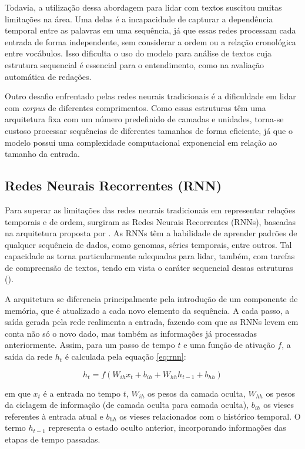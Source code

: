 Todavia, a utilização dessa abordagem para lidar com textos suscitou muitas limitações na área. Uma delas é a incapacidade de capturar a dependência temporal entre as palavras em uma sequência, já que essas redes processam cada entrada de forma independente, sem considerar a ordem ou a relação cronológica entre vocábulos. Isso dificulta o uso do modelo para análise de textos cuja estrutura sequencial é essencial para o entendimento, como na avaliação automática de redações.

Outro desafio enfrentado pelas redes neurais tradicionais é a dificuldade em lidar com \textit{corpus} de diferentes comprimentos. Como essas estruturas têm uma arquitetura fixa com um número predefinido de camadas e unidades, torna-se custoso processar sequências de diferentes tamanhos de forma eficiente, já que o modelo possui uma complexidade computacional exponencial em relação ao tamanho da entrada.

\subsection{Redes Neurais Recorrentes (RNN)}

Para superar as limitações das redes neurais tradicionais em representar relações temporais e de ordem, surgiram as Redes Neurais Recorrentes (RNNs), baseadas na arquitetura proposta por \citet{rumelhart-1986-learning}. As RNNs têm a habilidade de aprender padrões de qualquer sequência de dados, como genomas, séries temporais, entre outros. Tal capacidade as torna particularmente adequadas para lidar, também, com tarefas de compreensão de textos, tendo em vista o caráter sequencial dessas estruturas (\cite{zhang2023dive}).

A arquitetura se diferencia principalmente pela introdução de um componente de memória, que é atualizado a cada novo elemento da sequência. A cada passo, a saída gerada pela rede realimenta a entrada, fazendo com que as RNNs levem em conta não só o novo dado, mas também as informações já processadas anteriormente. Assim, para um passo de tempo $t$ e uma função de ativação $f$, a saída da rede $h_t$ é calculada pela equação \ref{eq:rnn}:

\begin{equation}
    \label{eq:rnn}
    h_t = f(W_{ih} x_t + b_{ih} + W_{hh} h_{t-1} + b_{hh})
\end{equation}

em que $x_t$ é a entrada no tempo $t$, $W_{ih}$ os pesos da camada oculta, $W_{hh}$ os pesos da ciclagem de informação (de camada oculta para camada oculta), $b_{ih}$ os vieses referentes à entrada atual e $b_{hh}$ os vieses relacionados com o histórico temporal. O termo $h_{t-1}$ representa o estado oculto anterior, incorporando informações das etapas de tempo passadas.

